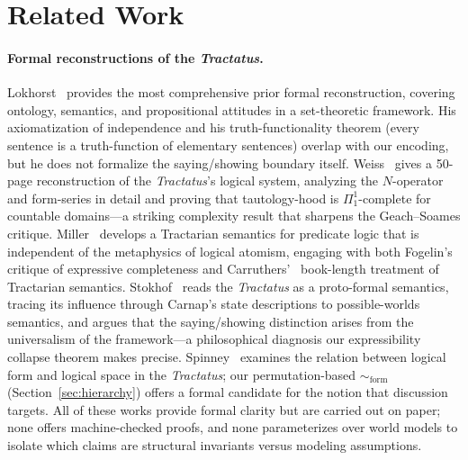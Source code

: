 \documentclass[10pt, letterpaper]{article}
\theoremstyle{definition}
\theoremstyle{remark}
\newcommand{\formEq}{\sim_{\mathrm{form}}}
\begin{document}
\section{Related Work}
\label{sec:related}

\paragraph{Formal reconstructions of the \emph{Tractatus}.}
Lokhorst~\cite{lokhorst1988} provides the most comprehensive
prior formal reconstruction, covering ontology, semantics, and
propositional attitudes in a set-theoretic framework.  His
axiomatization of independence and his truth-functionality
theorem (every sentence is a truth-function of elementary
sentences) overlap with our encoding, but he does not formalize
the saying/showing boundary itself.
Weiss~\cite{weiss2017} gives a 50-page reconstruction of the
\emph{Tractatus}'s logical system, analyzing the $N$-operator
and form-series in detail and proving that tautology-hood is
$\Pi^1_1$-complete for countable domains---a striking
complexity result that sharpens the Geach--Soames critique.
Miller~\cite{miller1995} develops a Tractarian semantics for
predicate logic that is independent of the metaphysics of
logical atomism, engaging with both Fogelin's~\cite{fogelin1987}
critique of expressive completeness and Carruthers'~\cite{carruthers1989}
book-length treatment of Tractarian semantics.
Stokhof~\cite{stokhof2008} reads the \emph{Tractatus} as a
proto-formal semantics, tracing its influence through Carnap's
state descriptions to possible-worlds semantics, and argues
that the saying/showing distinction arises from the
universalism of the framework---a philosophical diagnosis our
expressibility collapse theorem makes precise.
Spinney~\cite{spinney2022} examines the relation between logical
form and logical space in the \emph{Tractatus}; our
permutation-based $\formEq$ (Section~\ref{sec:hierarchy})
offers a formal candidate for the notion that discussion
targets.
All of these works provide formal clarity but are carried out
on paper; none offers machine-checked proofs, and none
parameterizes over world models to isolate which claims are
structural invariants versus modeling assumptions.
\end{document}
